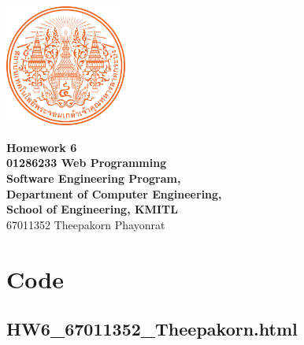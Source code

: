 \documentclass[12pt]{report} %
\begin{document}
\begin{titlepage}
	\centering
	\vspace*{1cm} %
	\includegraphics[width=0.3\textwidth]{../../images/KMITL Logo.png} %

	\vspace{1cm} %
	{\LARGE \textbf{Homework 6}} \\[0.5cm] %
	\vspace{0.5cm}
	{\large \textbf{01286233 Web Programming}} \\[0.5cm]
	{\large \textbf{Software Engineering Program,}} \\[0.5cm]
	{\large \textbf{Department of Computer Engineering,}} \\[0.5cm]
	{\large \textbf{School of Engineering, KMITL}} \\[1cm]
	{\Large 67011352 Theepakorn Phayonrat} \\[0.5cm] %
\end{titlepage}

\section*{Code}

\subsection*{HW6\_67011352\_Theepakorn.html}
\end{document}
